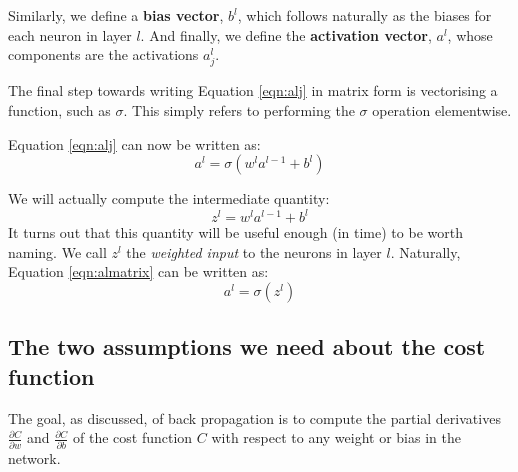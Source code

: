 \documentclass[11pt]{article}
\begin{document}
Similarly, we define a \textbf{bias vector}, \(b^l\), which follows naturally as the biases for each neuron in layer \(l\). And finally, we define the \textbf{activation vector}, \(a^l\), whose components are the activations \(a^l_j\).

The final step towards writing Equation \ref{eqn:alj} in matrix form is vectorising a function, such as \(\sigma\). This simply refers to performing the \(\sigma\) operation elementwise.

\vspace{0.3cm}

Equation \ref{eqn:alj} can now be written as:
\begin{equation} \label{eqn:almatrix}
a^l = \sigma(w^l a^{l-1} + b^l)
\end{equation}

We will actually compute the intermediate quantity:
\begin{equation}
  z^l = w^l a^{l-1} + b^l
\end{equation}
It turns out that this quantity will be useful enough (in time) to be worth naming. We call \(z^l\) the \emph{weighted input} to the neurons in layer \(l\). Naturally, Equation \ref{eqn:almatrix} can be written as:
\begin{equation} 
a^l = \sigma(z^l)
\end{equation}


\subsection{The two assumptions we need about the cost function}
\label{sec:org75689ce}
The goal, as discussed, of back propagation is to compute the partial derivatives \(\frac{\partial C}{\partial w}\) and \(\frac{\partial C}{\partial b}\) of the cost function \(C\) with respect to any weight or bias in the network. 
\end{document}
